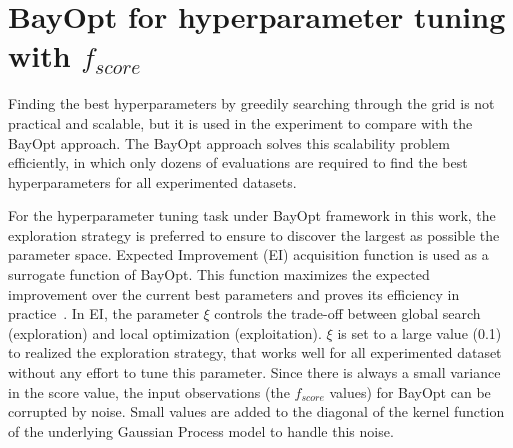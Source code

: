 \section{BayOpt for hyperparameter tuning with $f_{score}$}\label{sec:apply-bayopt}

Finding the best hyperparameters by greedily searching through the grid is not practical and scalable, but it is used in the experiment to compare with the BayOpt approach.
The BayOpt approach solves this scalability problem efficiently, in which only dozens of evaluations are required to find the best hyperparameters for all experimented datasets.

For the hyperparameter tuning task under BayOpt framework in this work, the exploration strategy is preferred to ensure to discover the largest as possible the parameter space.
Expected Improvement (EI) acquisition function is used as a surrogate function of BayOpt.
This function maximizes the expected improvement over the current best parameters and proves its efficiency in practice~\cite{snoek2012practical}.
In EI, the parameter $\xi$ controls the trade-off between global search (exploration) and local optimization (exploitation).
$\xi$ is set to a large value (0.1) to realized the exploration strategy, that works well for all experimented dataset without any effort to tune this parameter.
Since there is always a small variance in the score value, 
the input observations (the $f_{score}$ values) for BayOpt can be corrupted by noise.
Small values are added to the diagonal of the kernel function of the underlying Gaussian Process model to handle this noise.


